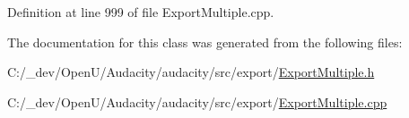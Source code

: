 Definition at line 999 of file Export\+Multiple.\+cpp.



The documentation for this class was generated from the following files\+:\begin{DoxyCompactItemize}
\item 
C\+:/\+\_\+dev/\+Open\+U/\+Audacity/audacity/src/export/\hyperlink{_export_multiple_8h}{Export\+Multiple.\+h}\item 
C\+:/\+\_\+dev/\+Open\+U/\+Audacity/audacity/src/export/\hyperlink{_export_multiple_8cpp}{Export\+Multiple.\+cpp}\end{DoxyCompactItemize}
